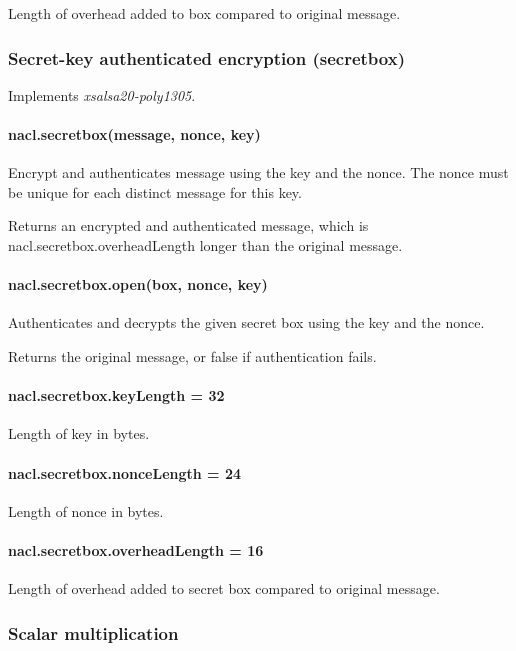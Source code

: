 Length of overhead added to box compared to original message.

\subsubsection*{Secret-\/key authenticated encryption (secretbox)}

Implements {\itshape xsalsa20-\/poly1305}.

\paragraph*{nacl.\+secretbox(message, nonce, key)}

Encrypt and authenticates message using the key and the nonce. The nonce must be unique for each distinct message for this key.

Returns an encrypted and authenticated message, which is {\ttfamily nacl.\+secretbox.\+overhead\+Length} longer than the original message.

\paragraph*{nacl.\+secretbox.\+open(box, nonce, key)}

Authenticates and decrypts the given secret box using the key and the nonce.

Returns the original message, or {\ttfamily false} if authentication fails.

\paragraph*{nacl.\+secretbox.\+key\+Length = 32}

Length of key in bytes.

\paragraph*{nacl.\+secretbox.\+nonce\+Length = 24}

Length of nonce in bytes.

\paragraph*{nacl.\+secretbox.\+overhead\+Length = 16}

Length of overhead added to secret box compared to original message.

\subsubsection*{Scalar multiplication}

